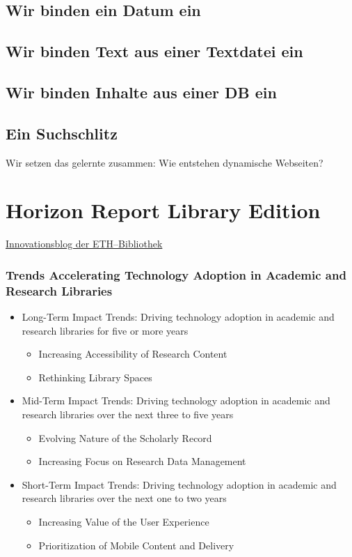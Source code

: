   \subsection{Wir binden ein Datum ein}
  \subsection{Wir binden Text aus einer Textdatei ein}
  \subsection{Wir binden Inhalte aus einer DB ein}
  \subsection{Ein Suchschlitz}
Wir setzen das gelernte zusammen: Wie entstehen dynamische Webseiten? 

\section{Horizon Report Library Edition}
  \href{http://blogs.ethz.ch/innovethbib/2015/08/24/horizon-report-2015-library-edition/}{Innovationsblog der ETH--Bibliothek}

  \begin{frame}
    \frametitle{Trends Accelerating Technology Adoption in Academic and Research Libraries}
      \begin{itemize}
        \item Long-Term Impact Trends: Driving technology adoption in academic and research libraries for five or more years
          \begin{itemize}
            \item Increasing Accessibility of Research Content
            \item Rethinking Library Spaces
          \end{itemize}
        \item Mid-Term Impact Trends: Driving technology adoption in academic and research libraries over the next three to five years
          \begin{itemize}
            \item Evolving Nature of the Scholarly Record
            \item Increasing Focus on Research Data Management
          \end{itemize}
        \item Short-Term Impact Trends: Driving technology adoption in academic and research libraries over the next one to two years
          \begin{itemize}
            \item Increasing Value of the User Experience
            \item Prioritization of Mobile Content and Delivery
          \end{itemize}
      \end{itemize}
  \end{frame}
  

